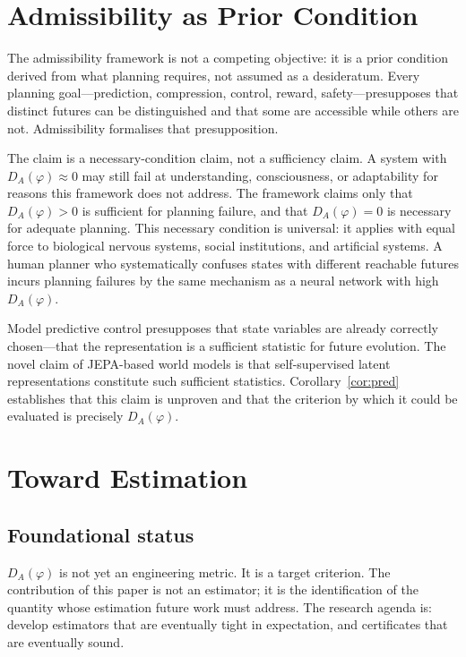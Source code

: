 \documentclass[10pt,twocolumn]{article}
\theoremstyle{plain}
\theoremstyle{definition}
\theoremstyle{remark}
\newcommand{\DA}{D_{A}(\varphi)}
\begin{document}
\section{Admissibility as Prior Condition}
\label{sec:prior}

The admissibility framework is not a competing objective: it is a prior condition
derived from what planning requires, not assumed as a desideratum. Every planning
goal---prediction, compression, control, reward, safety---presupposes that distinct
futures can be distinguished and that some are accessible while others are not.
Admissibility formalises that presupposition.

The claim is a necessary-condition claim, not a sufficiency claim. A system with
$\DA\approx 0$ may still fail at understanding, consciousness, or adaptability for
reasons this framework does not address. The framework claims only that $\DA>0$
is sufficient for planning failure, and that $\DA=0$ is necessary for adequate
planning. This necessary condition is universal: it applies with equal force to
biological nervous systems, social institutions, and artificial systems. A human
planner who systematically confuses states with different reachable futures incurs
planning failures by the same mechanism as a neural network with high $\DA$.

Model predictive control \citep{mayne2000model,garcia1989model} presupposes that
state variables are already correctly chosen---that the representation is a
sufficient statistic for future evolution. The novel claim of JEPA-based world
models is that self-supervised latent representations constitute such sufficient
statistics. Corollary~\ref{cor:pred} establishes that this claim is unproven and
that the criterion by which it could be evaluated is precisely $\DA$.

\section{Toward Estimation}
\label{sec:estimation}

\subsection{Foundational status}

$\DA$ is not yet an engineering metric. It is a target criterion. The contribution
of this paper is not an estimator; it is the identification of the quantity whose
estimation future work must address. The research agenda is: develop estimators
that are eventually tight in expectation, and certificates that are eventually
sound.
\end{document}
